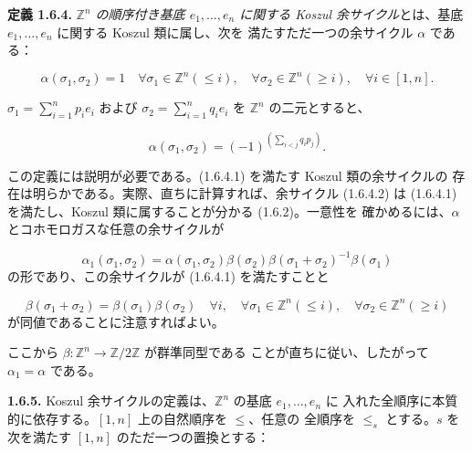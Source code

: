 \clearpage
{}%
\noindent\textbf{定義 1.6.4.}\quad
\emph{$\mathbb Z^n$ の順序付き基底 $e_1,\ldots,e_n$ に関する Koszul
余サイクル}とは、基底 $e_1,\ldots,e_n$ に関する Koszul 類に属し、次を
満たすただ一つの余サイクル $\alpha$ である：

\begin{equation}
  \alpha(\sigma_1,\sigma_2)=1
  \quad
  \forall\sigma_1\in\mathbb Z^n(\leq i),\quad
  \forall\sigma_2\in\mathbb Z^n(\geq i),\quad
  \forall i\in[1,n].
  \tag{1.6.4.1}
\end{equation}

$\sigma_1=\sum_{i=1}^{n}p_i e_i$ および
$\sigma_2=\sum_{i=1}^{n}q_i e_i$ を $\mathbb Z^n$ の二元とすると、

\begin{equation}
  \alpha(\sigma_1,\sigma_2)
  =(-1)^{\left(\sum_{i<j}q_i p_j\right)}.
  \tag{1.6.4.2}
\end{equation}

この定義には説明が必要である。(1.6.4.1) を満たす Koszul 類の余サイクルの
存在は明らかである。実際、直ちに計算すれば、余サイクル (1.6.4.2) は
(1.6.4.1) を満たし、Koszul 類に属することが分かる (1.6.2)。一意性を
確かめるには、$\alpha$ とコホモロガスな任意の余サイクルが

\begin{equation*}
  \alpha_1(\sigma_1,\sigma_2)
  =\alpha(\sigma_1,\sigma_2)
   \beta(\sigma_2)\beta(\sigma_1+\sigma_2)^{-1}\beta(\sigma_1)
\end{equation*}
の形であり、この余サイクルが (1.6.4.1) を満たすことと

\begin{equation*}
  \beta(\sigma_1+\sigma_2)=\beta(\sigma_1)\beta(\sigma_2)
  \quad
  \forall i,\quad
  \forall\sigma_1\in\mathbb Z^n(\leq i),\quad
  \forall\sigma_2\in\mathbb Z^n(\geq i)
\end{equation*}
が同値であることに注意すればよい。

ここから $\beta\colon\mathbb Z^n\to\mathbb Z/2\mathbb Z$ が群準同型である
ことが直ちに従い、したがって $\alpha_1=\alpha$ である。

\noindent\textbf{1.6.5.}\quad
Koszul 余サイクルの定義は、$\mathbb Z^n$ の基底 $e_1,\ldots,e_n$ に
入れた全順序に本質的に依存する。$[1,n]$ 上の自然順序を $\leq$、任意の
全順序を $\leq_s$ とする。$s$ を次を満たす $[1,n]$ のただ一つの置換とする：

